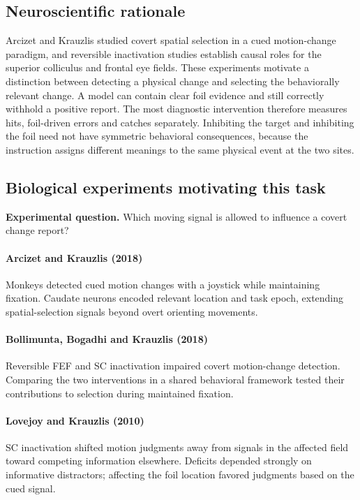 \documentclass[11pt]{article}
\begin{document}
\subsection{Neuroscientific rationale}
Arcizet and Krauzlis studied covert spatial selection in a cued motion-change paradigm, and reversible inactivation studies establish causal roles for the superior colliculus and frontal eye fields. These experiments motivate a distinction between detecting a physical change and selecting the behaviorally relevant change. A model can contain clear foil evidence and still correctly withhold a positive report. The most diagnostic intervention therefore measures hits, foil-driven errors and catches separately. Inhibiting the target and inhibiting the foil need not have symmetric behavioral consequences, because the instruction assigns different meanings to the same physical event at the two sites.

\subsection{Biological experiments motivating this task}
\textbf{Experimental question.} Which moving signal is allowed to influence a covert change report?

\paragraph{Arcizet and Krauzlis (2018)} Monkeys detected cued motion changes with a joystick while maintaining fixation. Caudate neurons encoded relevant location and task epoch, extending spatial-selection signals beyond overt orienting movements. \cite{bio_arcizet}

\paragraph{Bollimunta, Bogadhi and Krauzlis (2018)} Reversible FEF and SC inactivation impaired covert motion-change detection. Comparing the two interventions in a shared behavioral framework tested their contributions to selection during maintained fixation. \cite{bio_bollimunta}

\paragraph{Lovejoy and Krauzlis (2010)} SC inactivation shifted motion judgments away from signals in the affected field toward competing information elsewhere. Deficits depended strongly on informative distractors; affecting the foil location favored judgments based on the cued signal. \cite{bio_lovejoy}
\end{document}
